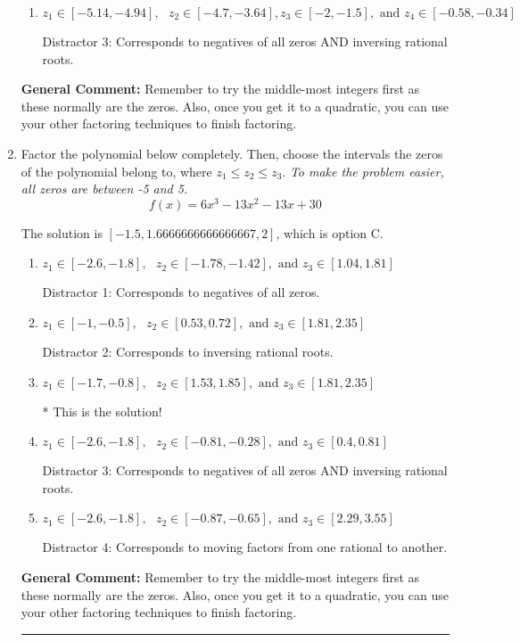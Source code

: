 \documentclass{extbook}[14pt]
\newcommand{\litem}[1]{\item #1

\rule{\textwidth}{0.4pt}}
\begin{document}
\begin{enumerate}
{\begin{enumerate}[label=\Alph*.]
 Distractor 4: Corresponds to moving factors from one rational to another.
\item \( z_1 \in [-5.14, -4.94], \text{   }  z_2 \in [-4.7, -3.64], z_3 \in [-2, -1.5], \text{   and   } z_4 \in [-0.58, -0.34] \)

 Distractor 3: Corresponds to negatives of all zeros AND inversing rational roots.
\end{enumerate}

\textbf{General Comment:} Remember to try the middle-most integers first as these normally are the zeros. Also, once you get it to a quadratic, you can use your other factoring techniques to finish factoring.
}
\litem{
Factor the polynomial below completely. Then, choose the intervals the zeros of the polynomial belong to, where $z_1 \leq z_2 \leq z_3$. \textit{To make the problem easier, all zeros are between -5 and 5.}
\[ f(x) = 6x^{3} -13 x^{2} -13 x + 30 \]

The solution is \( [-1.5, 1.6666666666666667, 2] \), which is option C.\begin{enumerate}[label=\Alph*.]
\item \( z_1 \in [-2.6, -1.8], \text{   }  z_2 \in [-1.78, -1.42], \text{   and   } z_3 \in [1.04, 1.81] \)

 Distractor 1: Corresponds to negatives of all zeros.
\item \( z_1 \in [-1, -0.5], \text{   }  z_2 \in [0.53, 0.72], \text{   and   } z_3 \in [1.81, 2.35] \)

 Distractor 2: Corresponds to inversing rational roots.
\item \( z_1 \in [-1.7, -0.8], \text{   }  z_2 \in [1.53, 1.85], \text{   and   } z_3 \in [1.81, 2.35] \)

* This is the solution!
\item \( z_1 \in [-2.6, -1.8], \text{   }  z_2 \in [-0.81, -0.28], \text{   and   } z_3 \in [0.4, 0.81] \)

 Distractor 3: Corresponds to negatives of all zeros AND inversing rational roots.
\item \( z_1 \in [-2.6, -1.8], \text{   }  z_2 \in [-0.87, -0.65], \text{   and   } z_3 \in [2.29, 3.55] \)

 Distractor 4: Corresponds to moving factors from one rational to another.
\end{enumerate}

\textbf{General Comment:} Remember to try the middle-most integers first as these normally are the zeros. Also, once you get it to a quadratic, you can use your other factoring techniques to finish factoring.
}
\end{enumerate}
\end{document}
